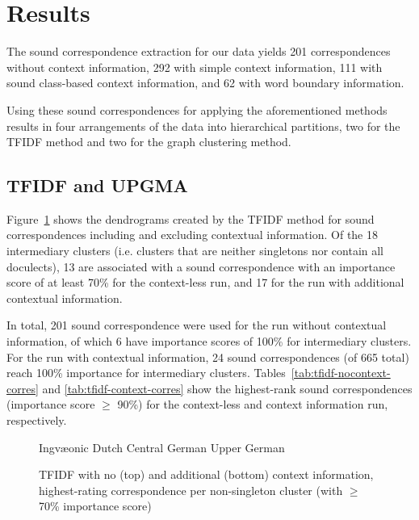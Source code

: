 \documentclass[a4paper]{article}
\def\upper{\color{red}\FilledBigTriangleUp}
\def\central{\color{Dandelion}\FilledBigSquare}
\def\dutch{\color{ForestGreen}\FilledBigCircle}
\def\ingv{\color{Blue}\BigCircle}
\begin{document}
\section{Results}
\label{sec:results}

The sound correspondence extraction for our data
yields 201 correspondences without context information,
292 with simple context information,
111 with sound class-based context information,
and 62 with word boundary information.

Using these sound correspondences for
applying the aforementioned methods results in
four arrangements of the data into hierarchical partitions,
two for the TFIDF method and two for the graph clustering method.

\subsection{TFIDF and UPGMA}

Figure~\ref{fig:tfidf-dendrograms} shows the dendrograms
created by the TFIDF method for sound correspondences
including and excluding contextual information.
Of the 18 intermediary clusters
(i.e. clusters that are neither singletons nor contain all doculects),
13 are associated with a sound correspondence with an importance score of at least 70\% for the context-less run,
and 17 for the run with additional contextual information. 

In total, 201 sound correspondence were used for the run without contextual information,
of which 6 have importance scores of 100\% for intermediary clusters.
For the run with contextual information,
24 sound correspondences (of 665 total) reach 100\% importance for intermediary clusters.
Tables~\ref{tab:tfidf-nocontext-corres} and \ref{tab:tfidf-context-corres}
show the highest-rank sound correspondences (importance score $\geq$ 90\%)
for the context-less and context information run, respectively.

\begin{figure}[h]


\vspace{0.3em}
\begin{center}
{\ingv} Ingv\ae{}onic \hspace{1em}
{\dutch} Dutch \hspace{1em}
{\central} Central German \hspace{1em}
{\upper} Upper German
\end{center}
\caption{TFIDF with no (top) and additional (bottom) context information, highest-rating correspondence per non-singleton cluster (with $\geq$70\% importance score)}
\label{fig:tfidf-dendrograms}
\end{figure}
\end{document}
